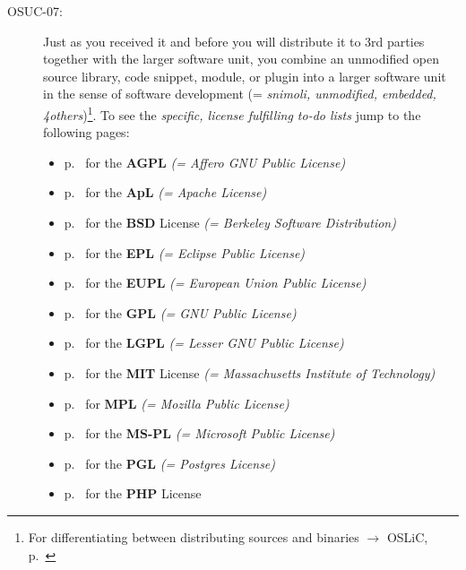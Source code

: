\begin{description}
\item[OSUC-07:]\label{OSUC-07-DEF} Just as you received it and before you will
distribute it to 3rd parties together with the larger software unit, you combine
an unmodified open source library, code snippet, module, or plugin into a larger
software unit in the sense of software development (= \textit{snimoli,
unmodified, embedded, 4others})\footnote{For differentiating between
distributing sources and binaries $\rightarrow$ OSLiC, p.\
\pageref{sec:SourceBinaryDifference}}.
To see the \textit{specific, license fulfilling to-do lists} jump to the
following pages:
   \begin{itemize}
    \item p.\ \pageref{OSUC-07-AGPL} for the \textbf{AGPL}
      \textit{(= Affero GNU Public License)} 
    \item p.\ \pageref{OSUC-07-Apache20} for the \textbf{ApL}
      \textit{(= Apache License)}
    \item p.\ \pageref{OSUC-07-BSD} for the \textbf{BSD} License
      \textit{(= Berkeley Software Distribution)}
    \item p.\ \pageref{OSUC-07-EPL} for the \textbf{EPL}
      \textit{(= Eclipse Public License)}     
    \item p.\ \pageref{OSUC-07-EUPL} for the \textbf{EUPL}
      \textit{(= European Union Public License)} 
    \item p.\ \pageref{OSUC-07-GPL} for the \textbf{GPL}
       \textit{(= GNU Public License)} 
    \item p.\ \pageref{OSUC-07-LGPL} for the \textbf{LGPL}
      \textit{(= Lesser GNU Public License)}           
    \item p.\ \pageref{OSUC-07-MIT} for the \textbf{MIT} License
       \textit{(= Massachusetts Institute of Technology)} 
    \item p.\ \pageref{OSUC-07-MPL} for \textbf{MPL}
      \textit{(= Mozilla Public License)}     
    \item p.\ \pageref{OSUC-07-MS-PL} for the \textbf{MS-PL}
      \textit{(= Microsoft Public License)} 
    \item p.\ \pageref{OSUC-07-PGL} for the \textbf{PGL}
      \textit{(= Postgres License)} 
    \item p.\ \pageref{OSUC-07-PHP} for the \textbf{PHP} License 
  \end{itemize}


\end{description}
